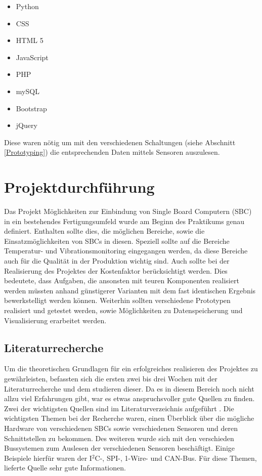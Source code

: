  \begin{itemize}
 \item Python
 \item CSS
 \item HTML 5
 \item JavaScript
 \item PHP
 \item mySQL
 \item Bootstrap
 \item jQuery
\end{itemize}  
Diese waren nötig um mit den verschiedenen Schaltungen (siehe Abschnitt \ref{Prototyping}) die entsprechenden Daten mittels Sensoren auszulesen.


\chapter{Projektdurchführung}
\label{Projektdurchführung}
Das Projekt \glqq Möglichkeiten zur Einbindung von Single Board Computern (SBC) in ein bestehendes Fertigungsumfeld\grqq
wurde am Beginn des Praktikums genau definiert. Enthalten sollte dies, die möglichen Bereiche, sowie die Einsatzmöglichkeiten von SBCs in diesen. Speziell sollte auf die Bereiche Temperatur- und Vibrationsmonitoring eingegangen werden, da diese Bereiche auch für die Qualität in der Produktion wichtig sind. Auch sollte bei der Realisierung des Projektes der Kostenfaktor berücksichtigt werden. Dies bedeutete, dass Aufgaben, die ansonsten mit teuren Komponenten realisiert werden müssten anhand günstigerer Varianten mit dem fast identischen Ergebnis bewerkstelligt werden können. Weiterhin sollten verschiedene Prototypen realisiert und getestet werden, sowie Möglichkeiten zu Datenspeicherung und Visualisierung erarbeitet werden. 

\section{Literaturrecherche}
Um die theoretischen Grundlagen für ein erfolgreiches realisieren des Projektes zu gewährleisten, befassten sich die ersten zwei bis drei Wochen mit der Literaturrecherche und dem studieren dieser. Da es in diesem Bereich noch nicht allzu viel Erfahrungen gibt, war es etwas anspruchsvoller gute Quellen zu finden. Zwei der wichtigsten Quellen sind im Literaturverzeichnis aufgeführt \citep{Bussysteme_in_der_Praxis} \citep{Raspberri_Pi_Handbuch}. Die wichtigsten Themen bei der Recherche waren, einen Überblick über die mögliche Hardware von verschiedenen SBCs sowie verschiedenen Sensoren und deren Schnittstellen zu bekommen. Des weiteren wurde sich mit den verschieden Bussystemen zum Auslesen der verschiedenen Sensoren beschäftigt. Einige Beispiele hierfür waren der I$^2$C-, SPI-, 1-Wire- und CAN-Bus. Für diese Themen, lieferte Quelle \citep{Bussysteme_in_der_Praxis} sehr gute Informationen.



